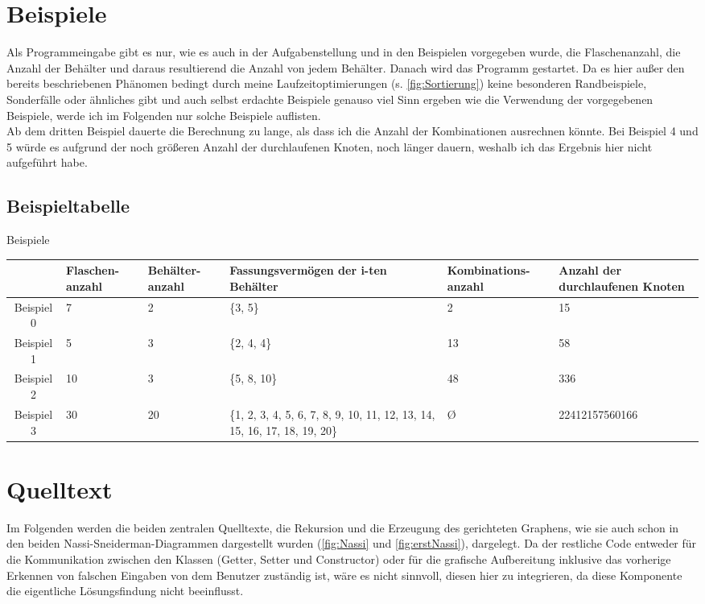 \documentclass[10pt,a4paper]{scrartcl}
\begin{document}
\section{Beispiele}
Als Programmeingabe gibt es nur, wie es auch in der Aufgabenstellung und in den Beispielen vorgegeben wurde, die Flaschenanzahl, die Anzahl der Behälter und daraus resultierend die Anzahl von jedem Behälter. Danach wird das Programm gestartet. Da es hier außer den bereits beschriebenen Phänomen bedingt durch meine Laufzeitoptimierungen (s. \autoref{fig:Sortierung}) keine besonderen \glqq{}Randbeispiele\grqq{}, \glqq{}Sonderfälle\grqq{} oder ähnliches gibt und auch selbst erdachte Beispiele genauso viel Sinn ergeben wie die Verwendung der vorgegebenen Beispiele, werde ich im Folgenden nur solche Beispiele auflisten.\\
Ab dem dritten Beispiel dauerte die Berechnung zu lange, als dass ich die Anzahl der Kombinationen ausrechnen könnte. Bei Beispiel 4 und 5 würde es aufgrund der noch größeren Anzahl der durchlaufenen Knoten, noch länger dauern, weshalb ich das Ergebnis hier nicht aufgeführt habe.
\subsection{Beispieltabelle}
	\begin{center}
	\begin{threeparttable} 
	\begin{large}
	\renewcommand{\arraystretch}{1.5}
	\caption{Beispiele}
		\begin{tabular}{|c||C{1.7cm}|C{1.7cm}|C{4cm}||C{2.5cm}|C{3.5cm}|}
			\hline
			& Flaschen-anzahl & Behälter-anzahl & Fassungsvermögen der i-ten Behälter & Kombinations-anzahl & Anzahl der durchlaufenen Knoten \tabularnewline 
			\hline \hline
			Beispiel 0 & 7 & 2 & \{3, 5\} & 2 & 15 \tabularnewline 
			\hline
			Beispiel 1 & 5 & 3 & \{2, 4, 4\} & 13 & 58 \tabularnewline 
			\hline
			Beispiel 2 & 10 & 3 & \{5, 8, 10\} & 48 & 336 \tabularnewline 
			\hline
			Beispiel 3 & 30 & 20 & \{1, 2, 3, 4, 5, 6, 7, 8, 9, 10, 11, 12, 13, 14, 15, 16, 17, 18, 19, 20\} & {\O}  & 22412157560166 \tabularnewline 
			\hline
		\end{tabular}
		\label{tab:meinetabelle}
	\end{large}
	\end{threeparttable} 
	\end{center}
\section{Quelltext}
Im Folgenden werden die beiden zentralen Quelltexte, die Rekursion und die Erzeugung des gerichteten Graphens, wie sie auch schon in den beiden Nassi-Sneiderman-Diagrammen dargestellt wurden (\autoref{fig:Nassi} und \autoref{fig:erstNassi}), dargelegt. Da der restliche Code entweder für die Kommunikation zwischen den Klassen (Getter, Setter und Constructor) oder für die grafische Aufbereitung inklusive das vorherige Erkennen von falschen Eingaben von dem Benutzer zuständig ist, wäre es nicht sinnvoll, diesen hier zu integrieren, da diese Komponente die eigentliche Lösungsfindung nicht beeinflusst.
\end{document}
